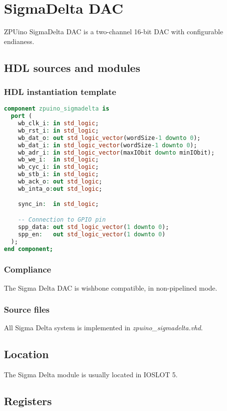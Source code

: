 \section{SigmaDelta DAC}
ZPUino SigmaDelta DAC is a two-channel 16-bit DAC with configurable endianess.
\subsection{HDL sources and modules}

\subsubsection{HDL instantiation template}
\begin{lstlisting}[language=VHDL]
component zpuino_sigmadelta is
  port (
    wb_clk_i: in std_logic;
    wb_rst_i: in std_logic;
    wb_dat_o: out std_logic_vector(wordSize-1 downto 0);
    wb_dat_i: in std_logic_vector(wordSize-1 downto 0);
    wb_adr_i: in std_logic_vector(maxIObit downto minIObit);
    wb_we_i:  in std_logic;
    wb_cyc_i: in std_logic;
    wb_stb_i: in std_logic;
    wb_ack_o: out std_logic;
    wb_inta_o:out std_logic;

    sync_in:  in std_logic;

    -- Connection to GPIO pin
    spp_data: out std_logic_vector(1 downto 0);
    spp_en:   out std_logic_vector(1 downto 0)
  );
end component;
\end{lstlisting}

\subsubsection{Compliance}
The Sigma Delta DAC is wishbone compatible, in non-pipelined mode.

\subsubsection{Source files}
All Sigma Delta system is implemented in \emph{zpuino\_sigmadelta.vhd}.

\subsection{Location}
The Sigma Delta module is usually located in IOSLOT 5.

\subsection{Registers}

